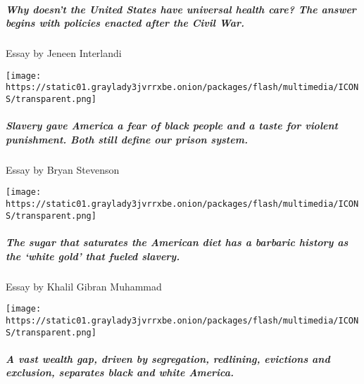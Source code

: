 \href{/interactive/2019/08/14/magazine/universal-health-care-racism.html}{}

\hypertarget{why-doesnt-the-united-states-have-universal-health-care-the-answer-begins-with-policies-enacted-after-the-civil-war}{%
\subparagraph{Why doesn't the U﻿nited States have universal health care?
The answer begins with policies enacted after the Civil
War.}\label{why-doesnt-the-united-states-have-universal-health-care-the-answer-begins-with-policies-enacted-after-the-civil-war}}

Essay by Jeneen Interlandi

\texttt{[image: https://static01.graylady3jvrrxbe.onion/packages/flash/multimedia/ICONS/transparent.png]}

\href{/interactive/2019/08/14/magazine/prison-industrial-complex-slavery-racism.html}{}

\hypertarget{slavery-gave-america-a-fear-of-black-people-and-a-taste-for-violent-punishment-both-still-define-our-prison-system}{%
\subparagraph{Slavery gave America a fear of black people and a taste
for violent punishment. Both still define our prison
system.}\label{slavery-gave-america-a-fear-of-black-people-and-a-taste-for-violent-punishment-both-still-define-our-prison-system}}

Essay by Bryan Stevenson

\texttt{[image: https://static01.graylady3jvrrxbe.onion/packages/flash/multimedia/ICONS/transparent.png]}

\href{/interactive/2019/08/14/magazine/sugar-slave-trade-slavery.html}{}

\hypertarget{the-sugar-that-saturates-the-american-diet-has-a-barbaric-history-as-the-white-gold-that-fueled-slavery}{%
\subparagraph{The sugar that saturates the American diet has a barbaric
history as the `white gold' that fueled
slavery.}\label{the-sugar-that-saturates-the-american-diet-has-a-barbaric-history-as-the-white-gold-that-fueled-slavery}}

Essay by Khalil Gibran Muhammad

\texttt{[image: https://static01.graylady3jvrrxbe.onion/packages/flash/multimedia/ICONS/transparent.png]}

\href{/interactive/2019/08/14/magazine/racial-wealth-gap.html}{}

\hypertarget{a-vast-wealth-gap-driven-by-segregation-redlining-evictions-and-exclusion-separates-black-and-white-america}{%
\subparagraph{A vast wealth gap, driven by segregation, redlining,
evictions and exclusion, separates black and white
America.}\label{a-vast-wealth-gap-driven-by-segregation-redlining-evictions-and-exclusion-separates-black-and-white-america}}

